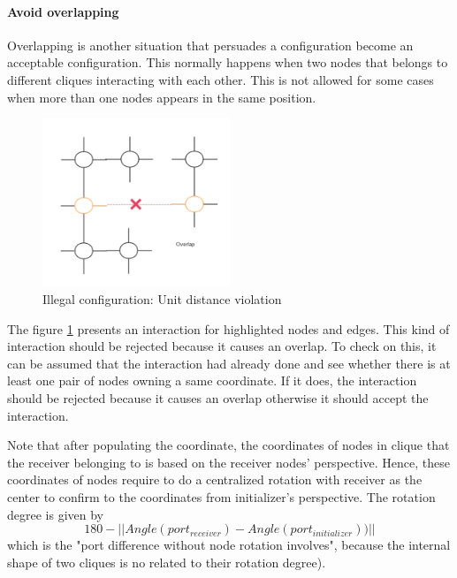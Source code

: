 \paragraph{Avoid overlapping}\noindent
Overlapping is another situation that persuades a configuration become an acceptable
configuration. This normally happens when two nodes that belongs to different cliques
interacting with each other. This is not allowed for some cases when more than one nodes
appears in the same position.
\begin{figure}[H]
\begin{center}
\includegraphics[width = 0.5\textwidth]{context/diagram/overlap.pdf}
\caption{Illegal configuration: Unit distance violation}
\label{overlap}
\end{center}
\end{figure}
\par\noindent
The figure \ref{overlap} presents an interaction for highlighted nodes and edges.
This kind of interaction should be rejected because it causes an overlap. To check on this, it can be assumed that
the interaction had already done and see whether there is at least one pair of nodes
owning a same coordinate. If it does, the interaction should be rejected because it causes
an overlap otherwise it should accept the interaction.

\par\noindent
Note that after populating the coordinate, the coordinates of nodes in clique that the receiver belonging to
is based on the receiver nodes' perspective. Hence, these coordinates of nodes require to do a centralized rotation with receiver as the center to
confirm to the coordinates from initializer's perspective. The rotation degree is given by
$$180 - ||Angle(port_{receiver}) - Angle(port_{initializer}))||$$ which is the "port difference without node rotation involves", because the internal
shape of two cliques is no related to their rotation degree).


